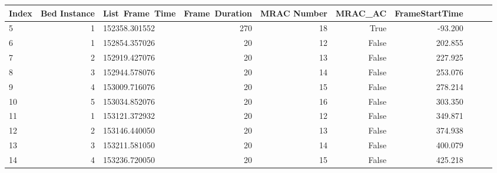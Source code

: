 \begin{table}[]
\begin{tabular}{lrlrrrrrlr}
\toprule
{Index} &  Bed Instance &  List\ Frame\ Time &  Frame\ Duration & MRAC Number &  MRAC\_AC &  FrameStartTime \\
\midrule
5  &         1 &  152358.301552 &            270 &           18 &          True &         -93.200 \\
6  &         1 &  152854.357026 &             20 &           12 &          False &         202.855 \\
7  &         2 &  152919.427076 &             20 &           13 &          False &         227.925 \\
8  &         3 &  152944.578076 &             20 &           14 &          False &         253.076 \\
9  &         4 &  153009.716076 &             20 &           15 &          False &         278.214 \\
10 &         5 &  153034.852076 &             20 &           16 &          False &         303.350 \\
11 &         1 &  153121.372932 &             20 &           12 &          False &         349.871 \\
12 &         2 &  153146.440050 &             20 &           13 &          False &         374.938 \\
13 &         3 &  153211.581050 &             20 &           14 &          False &         400.079 \\
14 &         4 &  153236.720050 &             20 &           15 &          False &         425.218 \\
\bottomrule
\end{tabular}
\end{table}

